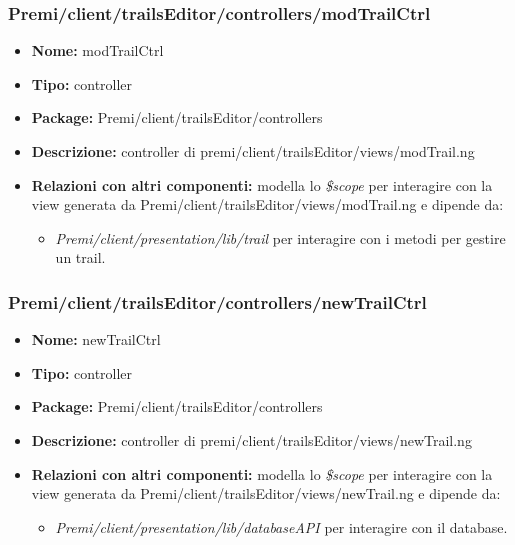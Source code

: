 \subsubsection{Premi/client/trailsEditor/controllers/modTrailCtrl}
\begin{itemize}
  \item[] \textbf{Nome:} modTrailCtrl
  \item[] \textbf{Tipo:} controller
  \item[] \textbf{Package:} Premi/client/trailsEditor/controllers
  \item[] \textbf{Descrizione:} controller di premi/client/trailsEditor/views/modTrail.ng
  \item[] \textbf{Relazioni con altri componenti:} modella lo \textit{\$scope} per interagire con la view generata da Premi/client/trailsEditor/views/modTrail.ng e dipende da:
  \begin{itemize}
  	\item \textit{Premi/client/presentation/lib/trail} per interagire con i metodi per gestire un trail.
  \end{itemize}
\end{itemize}
\subsubsection{Premi/client/trailsEditor/controllers/newTrailCtrl}
\begin{itemize}
  \item[] \textbf{Nome:} newTrailCtrl
  \item[] \textbf{Tipo:} controller
  \item[] \textbf{Package:} Premi/client/trailsEditor/controllers
  \item[] \textbf{Descrizione:} controller di premi/client/trailsEditor/views/newTrail.ng
  \item[] \textbf{Relazioni con altri componenti:} modella lo \textit{\$scope} per interagire con la view generata da Premi/client/trailsEditor/views/newTrail.ng e dipende da:
  \begin{itemize}
  	\item \textit{Premi/client/presentation/lib/databaseAPI} per interagire con il database.
  \end{itemize}
\end{itemize}
